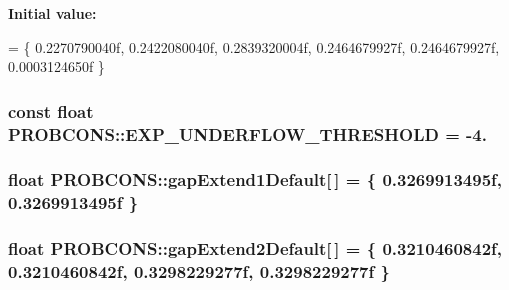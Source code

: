 {\bfseries Initial value\+:}
\begin{DoxyCode}
= \{
  0.2270790040f, 0.2422080040f, 0.2839320004f, 0.2464679927f, 0.2464679927f, 0.0003124650f 
\}
\end{DoxyCode}
\hypertarget{namespace_p_r_o_b_c_o_n_s_a4074cb3928409c0f0b0d7fce9d2576b0}{
\subsubsection[{E\+X\+P\+\_\+\+U\+N\+D\+E\+R\+F\+L\+O\+W\+\_\+\+T\+H\+R\+E\+S\+H\+O\+L\+D}]{\setlength{\rightskip}{0pt plus 5cm}const float P\+R\+O\+B\+C\+O\+N\+S\+::\+E\+X\+P\+\_\+\+U\+N\+D\+E\+R\+F\+L\+O\+W\+\_\+\+T\+H\+R\+E\+S\+H\+O\+L\+D = -\/4.}}\label{namespace_p_r_o_b_c_o_n_s_a4074cb3928409c0f0b0d7fce9d2576b0}
\hypertarget{namespace_p_r_o_b_c_o_n_s_a833e6c5dcb9594b964de8651c139d655}{
\subsubsection[{gap\+Extend1\+Default}]{\setlength{\rightskip}{0pt plus 5cm}float P\+R\+O\+B\+C\+O\+N\+S\+::gap\+Extend1\+Default\mbox{[}$\,$\mbox{]} = \{ 0.\+3269913495f, 0.\+3269913495f \}}}\label{namespace_p_r_o_b_c_o_n_s_a833e6c5dcb9594b964de8651c139d655}
\hypertarget{namespace_p_r_o_b_c_o_n_s_a1880db9507d0a694a8858b86c81c91ed}{
\subsubsection[{gap\+Extend2\+Default}]{\setlength{\rightskip}{0pt plus 5cm}float P\+R\+O\+B\+C\+O\+N\+S\+::gap\+Extend2\+Default\mbox{[}$\,$\mbox{]} = \{ 0.\+3210460842f, 0.\+3210460842f, 0.\+3298229277f, 0.\+3298229277f \}}}\label{namespace_p_r_o_b_c_o_n_s_a1880db9507d0a694a8858b86c81c91ed}
